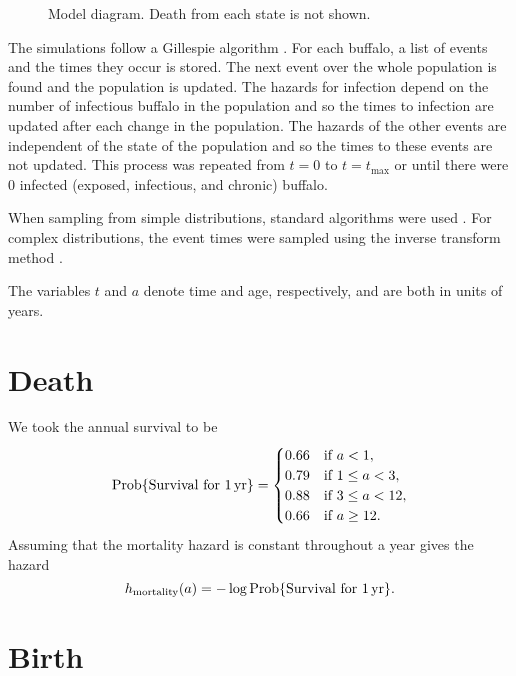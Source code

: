 \documentclass[12pt]{article}
\DeclareMathOperator{\Prob}{Prob}
\begin{document}
\begin{figure}
  \centering
  
  \caption{Model diagram.  Death from each state is not shown.}
  \label{fig:diagram}
\end{figure}


The simulations follow a Gillespie algorithm \citep{gillespie_1977}.
For each buffalo, a list of events and the times they occur is stored.
The next event over the whole population is found and the population
is updated.  The hazards for infection depend on the number of
infectious buffalo in the population and so the times to infection are
updated after each change in the population.  The hazards of the other
events are independent of the state of the population and so the times
to these events are not updated.  This process was repeated from $t =
0$ to $t = t_{\text{max}}$ or until there were $0$ infected (exposed,
infectious, and chronic) buffalo.

When sampling from simple distributions, standard algorithms were used
\citep{scipy}.  For complex distributions, the event times were
sampled using the inverse transform method \citep{rubinstein_1981}.

The variables $t$ and $a$ denote time and age, respectively, and are
both in units of years.

\section{Death}

We took the annual survival to be
\begin{equation}
  \Prob\{\text{Survival for $\unit[1]{yr}$}\}
  =
  \begin{cases}
    0.66 & \text{if $a < 1$},
    \\
    0.79 & \text{if $1 \leq a < 3$},
    \\
    0.88 & \text{if $3 \leq a < 12$},
    \\
    0.66 & \text{if $a \geq 12$}.
  \end{cases}
\end{equation}
Assuming that the mortality hazard is constant throughout a year gives
the hazard
\begin{equation}
  h_{\text{mortality}}(a)
  = - \log \Prob\{\text{Survival for $\unit[1]{yr}$}\}.
\end{equation}


\section{Birth}
\end{document}
